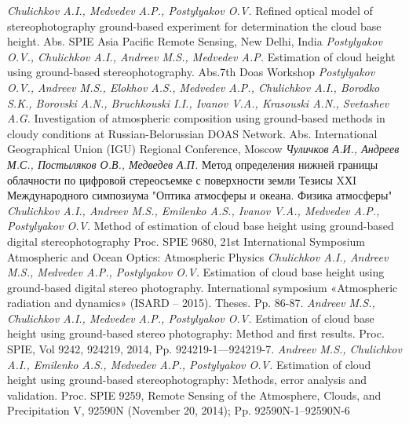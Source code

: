 \renewcommand{\refname}{Список использованных источников}
\begin{thebibliography}{99}

 \emph{Chulichkov A.I., Medvedev A.P., Postylyakov O.V.} Refined optical model of stereophotography ground-based experiment for determination the cloud base height. Abs. SPIE Asia Pacific Remote Sensing, New Delhi, India
 \emph{Postylyakov O.V., Chulichkov A.I., Andreev M.S., Medvedev A.P.} Estimation of cloud height using ground-based stereophotography. Abs.7th Doas Workshop
 \emph{Postylyakov O.V., Andreev M.S., Elokhov A.S., Medvedev A.P., Chulichkov A.I., Borodko S.K., Borovski A.N., Bruchkouski I.I., Ivanov V.A., Krasouski A.N., Svetashev A.G.} Investigation of atmospheric composition using ground-based methods in cloudy conditions at Russian-Belorussian DOAS Network.  Abs. International Geographical Union (IGU) Regional Conference, Moscow
 \emph{Чуличков А.И., Андреев М.С., Постыляков О.В., Медведев А.П.} Метод определения нижней границы облачности по цифровой стереосъемке с поверхности земли
Тезисы XХI Международного симпозиума "Оптика атмосферы и океана. Физика атмосферы"
 \emph{Chulichkov A.I., Andreev M.S., Emilenko A.S., Ivanov V.A., Medvedev A.P., Postylyakov O.V.} Method of estimation of cloud base height using ground-based digital stereophotography Proc. SPIE  9680, 21st International Symposium Atmospheric and Ocean Optics: Atmospheric Physics
 \emph{Chulichkov A.I., Andreev M.S., Medvedev A.P., Postylyakov O.V.} Estimation of cloud base height using ground-based digital stereo photography. International symposium «Atmospheric radiation and dynamics» (ISARD – 2015).
Theses. Pp. 86-87.
 \emph{Andreev M.S., Chulichkov A.I., Medvedev A.P., Postylyakov O.V.} Estimation of cloud base height using ground-based stereo photography: Method and first results. Proc. SPIE, Vol 9242, 924219, 2014, Pp. 924219-1—924219-7.
 \emph{Andreev M.S., Chulichkov A.I., Emilenko  A.S., Medvedev A.P., Postylyakov O.V.} Estimation of cloud height using ground-based stereophotography: Methods, error analysis and validation. Proc. SPIE 9259, Remote Sensing of the Atmosphere, Clouds, and Precipitation V, 92590N (November 20, 2014); Pp. 92590N-1--92590N-6



\end{thebibliography}
